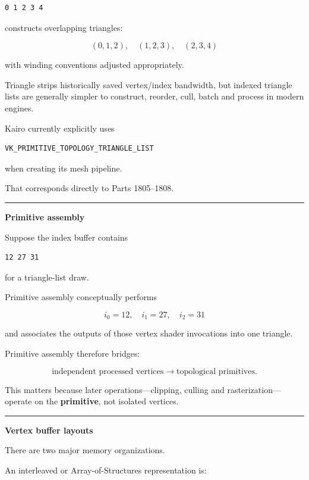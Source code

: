 \begin{verbatim}
0 1 2 3 4
\end{verbatim}

constructs overlapping triangles:

\[
(0,1,2),\quad
(1,2,3),\quad
(2,3,4)
\]

with winding conventions adjusted appropriately.

Triangle strips historically saved vertex/index bandwidth, but indexed triangle lists are generally simpler to construct, reorder, cull, batch and process in modern engines.

Kairo currently explicitly uses

\begin{verbatim}
VK_PRIMITIVE_TOPOLOGY_TRIANGLE_LIST
\end{verbatim}

when creating its mesh pipeline.

That corresponds directly to Parts 1805--1808.

\begin{center}\rule{0.5\linewidth}{0.5pt}\end{center}

\textbf{Primitive assembly}

Suppose the index buffer contains

\begin{verbatim}
12 27 31
\end{verbatim}

for a triangle-list draw.

Primitive assembly conceptually performs

\[
i_0=12,\quad i_1=27,\quad i_2=31
\]

and associates the outputs of those vertex shader invocations into one triangle.

Primitive assembly therefore bridges:

\[
\text{independent processed vertices}
\rightarrow
\text{topological primitives}.
\]

This matters because later operations---clipping, culling and rasterization---operate on the \textbf{primitive}, not isolated vertices.

\begin{center}\rule{0.5\linewidth}{0.5pt}\end{center}

\textbf{Vertex buffer layouts}

There are two major memory organizations.

An interleaved or Array-of-Structures representation is:

